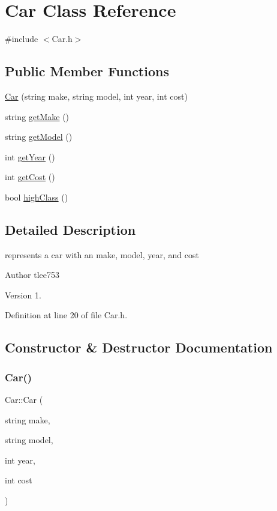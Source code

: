 \section{Car Class Reference}
\label{class_car}


{\ttfamily \#include $<$Car.\+h$>$}

\subsection*{Public Member Functions}
\begin{DoxyCompactItemize}
\item 
\hyperlink{class_car_a9842a8a734dce534d3be923224cd6b03}{Car} (string make, string model, int year, int cost)
\item 
string \hyperlink{class_car_a9122cc2786555a4ebf391419ae00789e}{get\+Make} ()
\item 
string \hyperlink{class_car_a289787c878ee8aa2f5bd111ff2d927f5}{get\+Model} ()
\item 
int \hyperlink{class_car_a41336fc661d8919c2323a3b4554e3a19}{get\+Year} ()
\item 
int \hyperlink{class_car_ab96cce1215527b2a6f1920e848d145e7}{get\+Cost} ()
\item 
bool \hyperlink{class_car_ae7eb35511bf597b017bfbaaa6f91ff79}{high\+Class} ()
\end{DoxyCompactItemize}


\subsection{Detailed Description}
represents a car with an make, model, year, and cost

\begin{DoxyAuthor}{Author}
tlee753 
\end{DoxyAuthor}
\begin{DoxyVersion}{Version}
1. 
\end{DoxyVersion}


Definition at line 20 of file Car.\+h.



\subsection{Constructor \& Destructor Documentation}
\mbox{\label{class_car_a9842a8a734dce534d3be923224cd6b03}} 
\subsubsection{\texorpdfstring{Car()}{Car()}}
{\footnotesize\ttfamily Car\+::\+Car (\begin{DoxyParamCaption}\item[{string}]{make,  }\item[{string}]{model,  }\item[{int}]{year,  }\item[{int}]{cost }\end{DoxyParamCaption})}

